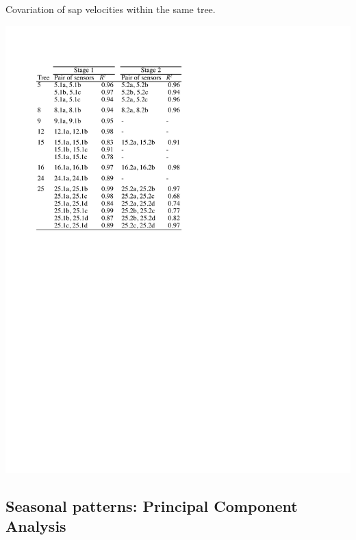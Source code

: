 \begin{table}
  \caption{Covariation of sap velocities within the same tree.}
  \label{tbl:sapflow_covar}
  \includegraphics[width=\linewidth]{ch1-sapflow/tables/TableA1.pdf}
\end{table}

\subsection{Seasonal patterns: Principal Component Analysis}
\label{sec:seasonal}

